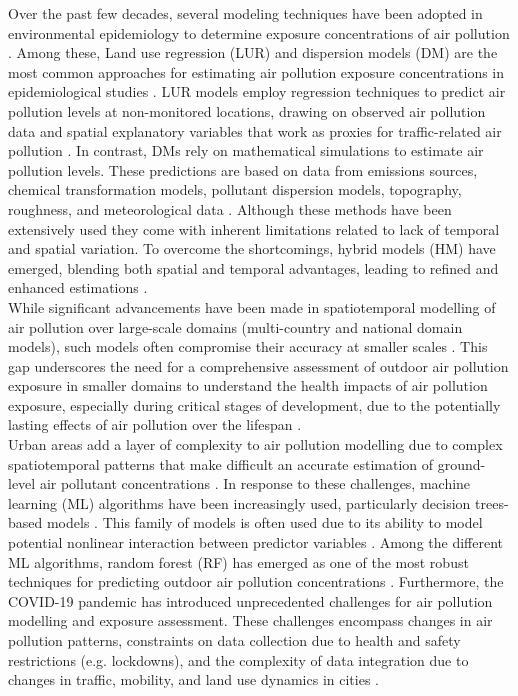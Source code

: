\documentclass{article}
\begin{document}
Over the past few decades, several modeling techniques have been adopted in environmental epidemiology to determine exposure concentrations of air pollution \cite{hoek2017, di2019no2, di2019pm25, stafoggia2019, stafoggia2020}. Among these, Land use regression (LUR) and dispersion models (DM) are the most common approaches for estimating air pollution exposure concentrations in epidemiological studies \cite{gulliver2015, dehoogh2014}. LUR models employ regression techniques to predict air pollution levels at non-monitored locations, drawing on observed air pollution data and spatial explanatory variables that work as proxies for traffic-related air pollution \cite{briggs1997, hoek2008}. In contrast, DMs rely on mathematical simulations to estimate air pollution levels. These predictions are based on data from emissions sources, chemical transformation models, pollutant dispersion models, topography, roughness, and meteorological data \cite{hoek2017}. Although these methods have been extensively used they come with inherent limitations related to lack of temporal and spatial variation. To overcome the shortcomings, hybrid models (HM) have emerged, blending both spatial and temporal advantages, leading to refined and enhanced estimations \cite{hoek2017, korek2017, tularam2021, oh2021}. \\

While significant advancements have been made in spatiotemporal modelling of air pollution over large-scale domains (multi-country and national domain models), such models often compromise their accuracy at smaller scales \cite{dehoogh2016, chen2019, chen2020, shen2022}. This gap underscores the need for a comprehensive assessment of outdoor air pollution exposure in smaller domains to understand the health impacts of air pollution exposure, especially during critical stages of development, due to the potentially lasting effects of air pollution over the lifespan \cite{selevan2000, wick2010, ghosh2021}. \\

Urban areas add a layer of complexity to air pollution modelling due to complex spatiotemporal patterns that make difficult an accurate estimation of ground-level air pollutant concentrations \cite{sokhi2022}. In response to these challenges, machine learning (ML) algorithms have been increasingly used, particularly decision trees-based models \cite{liu2022}. This family of models is often used due to its ability to model potential nonlinear interaction between predictor variables \cite{liu2022treebased}. Among the different ML algorithms, random forest (RF) has emerged as one of the most robust techniques for predicting outdoor air pollution concentrations \cite{chen2019, chen2020, stafoggia2019, stafoggia2020, schneider2020, mila2023}. Furthermore, the COVID-19 pandemic has introduced unprecedented challenges for air pollution modelling and exposure assessment. These challenges encompass changes in air pollution patterns, constraints on data collection due to health and safety restrictions (e.g. lockdowns), and the complexity of data integration due to changes in traffic, mobility, and land use dynamics in cities \cite{gonzalez2022, querol2021}. \\
 
\end{document}
